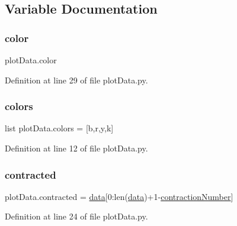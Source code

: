 \subsection{Variable Documentation}
\mbox{\label{namespaceplot_data_a0bf3fb4a650e2f9eea6c07f84bfd3745}} 
\subsubsection{\texorpdfstring{color}{color}}
{\footnotesize\ttfamily plot\+Data.\+color}



Definition at line 29 of file plot\+Data.\+py.

\mbox{\label{namespaceplot_data_a3973b174067454c6d6fb4a100600574b}} 
\subsubsection{\texorpdfstring{colors}{colors}}
{\footnotesize\ttfamily list plot\+Data.\+colors = \mbox{[}\textquotesingle{}b\textquotesingle{},\textquotesingle{}r\textquotesingle{},\textquotesingle{}y\textquotesingle{},\textquotesingle{}k\textquotesingle{}\mbox{]}}



Definition at line 12 of file plot\+Data.\+py.

\mbox{\label{namespaceplot_data_a82986c14482fcee60f04f418a09ca49c}} 
\subsubsection{\texorpdfstring{contracted}{contracted}}
{\footnotesize\ttfamily plot\+Data.\+contracted = \hyperlink{namespaceplot_data_a44c9f3af3147f385257597dd63d09e3a}{data}\mbox{[}0\+:len(\hyperlink{namespaceplot_data_a44c9f3af3147f385257597dd63d09e3a}{data})+1-\/\hyperlink{namespaceplot_data_af459551cfb398cc731a4c51c4d44df41}{contraction\+Number}\mbox{]}}



Definition at line 24 of file plot\+Data.\+py.

